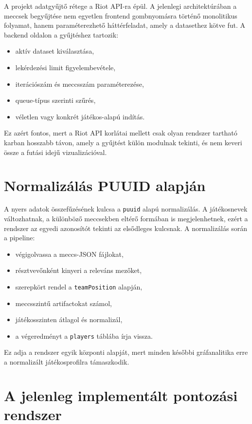 \documentclass[a4paper,12pt]{report}
\begin{document}
A projekt adatgyűjtő rétege a Riot API-ra épül. A jelenlegi architektúrában a meccsek begyűjtése nem egyetlen frontend gombnyomásra történő monolitikus folyamat, hanem paraméterezhető háttérfeladat, amely a datasethez kötve fut. A backend oldalon a gyűjtéshez tartozik:

\begin{itemize}
    \item aktív dataset kiválasztása,
    \item lekérdezési limit figyelembevétele,
    \item iterációszám és meccsszám paraméterezése,
    \item queue-típus szerinti szűrés,
    \item véletlen vagy konkrét játékos-alapú indítás.
\end{itemize}

Ez azért fontos, mert a Riot API korlátai mellett csak olyan rendszer tartható karban hosszabb távon, amely a gyűjtést külön modulnak tekinti, és nem keveri össze a futási idejű vizualizációval.

\section{Normalizálás PUUID alapján}

A nyers adatok összefűzésének kulcsa a \texttt{puuid} alapú normalizálás. A játékosnevek változhatnak, a különböző meccsekben eltérő formában is megjelenhetnek, ezért a rendszer az egyedi azonosítót tekinti az elsődleges kulcsnak. A normalizálás során a pipeline:

\begin{itemize}
    \item végigolvassa a meccs-JSON fájlokat,
    \item résztvevőnként kinyeri a releváns mezőket,
    \item szerepkört rendel a \texttt{teamPosition} alapján,
    \item meccsszintű artifactokat számol,
    \item játékosszinten átlagol és normalizál,
    \item a végeredményt a \texttt{players} táblába írja vissza.
\end{itemize}

Ez adja a rendszer egyik központi alapját, mert minden későbbi gráfanalitika erre a normalizált játékosprofilra támaszkodik.

\section{A jelenleg implementált pontozási rendszer}
\end{document}
